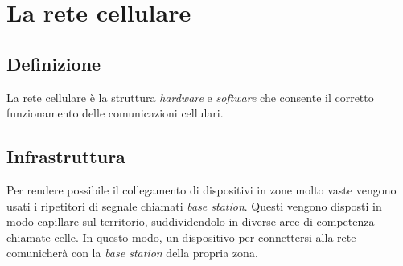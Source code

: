 \section{La rete cellulare}
\subsection{Definizione}
La rete cellulare è la struttura \textit{hardware} e \textit{software} che consente il corretto
funzionamento delle comunicazioni cellulari.
\subsection{Infrastruttura}
Per rendere possibile il collegamento di dispositivi in zone molto vaste vengono usati i ripetitori di segnale chiamati \textit{base station}. 
Questi vengono
disposti in modo capillare sul territorio, suddividendolo in diverse aree di competenza chiamate celle.
In questo modo, un dispositivo per connettersi alla rete comunicherà con la \textit{base station} della
propria zona.